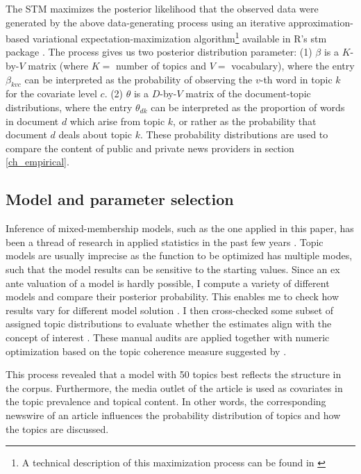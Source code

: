 \documentclass[12pt,a4paper,notitlepage]{article}
\begin{document}
The STM maximizes the posterior likelihood that the observed data were generated by the above data-generating process using an iterative approximation-based variational expectation-maximization algorithm\footnote{A technical description of this maximization process can be found in \citet{roberts_model_2016}} available in R's stm package \citep{roberts_stm:_2016}. The process gives us two posterior distribution parameter: (1) $\beta$ is a $K$-by-$V$ matrix (where $K=$ number of topics and $V=$ vocabulary), where the entry $\beta_{kvc}$ can be interpreted as the probability of observing the $v$-th word in topic $k$ for the covariate level $c$. (2) $\theta$ is a $D$-by-$V$ matrix of the document-topic distributions, where the entry $\theta_{dk}$ can be interpreted as the proportion of words in document $d$ which arise from topic $k$, or rather as the probability that document $d$ deals about topic $k$. These probability distributions are used to compare the content of public and private news providers in section \ref{ch_empirical}.


\subsection{Model and parameter selection}

Inference of mixed-membership models, such as the one applied in this paper, has been a thread of research in applied statistics in the past few years \citep{blei_latent_2003} \citep{erosheva_mixed-membership_2004} \citep{braun_variational_2010}. Topic models are usually imprecise as the function to be optimized has multiple modes, such that the model results can be sensitive to the starting values. Since an ex ante valuation of a model is hardly possible, I compute a variety of different models and compare their posterior probability. This enables me to check how results vary for different model solution \citep{roberts_navigating_2016}. I then cross-checked some subset of assigned topic distributions to evaluate whether the estimates align with the concept of interest \citep{gentzkow_text_2017}. These manual audits are applied together with numeric optimization based on the topic coherence measure suggested by \citet{mimno_optimizing_2011}. 

This process revealed that a model with 50 topics best reflects the structure in the corpus. Furthermore, the media outlet of the article is used as covariates in the topic prevalence and topical content. In other words, the corresponding newswire of an article influences the probability distribution of topics and how the topics are discussed. 
\end{document}
